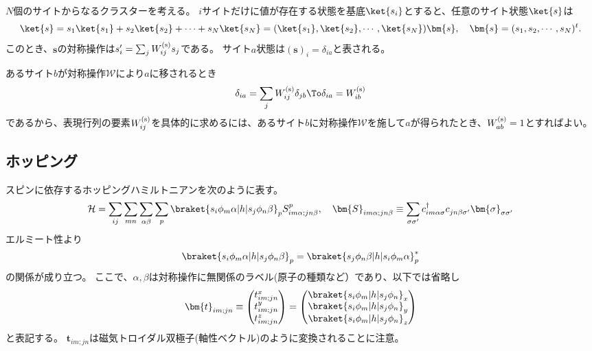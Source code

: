 \documentclass[11pt]{easymemo}
\begin{document}
$N$個のサイトからなるクラスターを考える。
$i$サイトだけに値が存在する状態を基底$\ket{s_{i}}$とすると、任意のサイト状態$\ket{s}$は
\begin{align}
  \ket{s}=s_{1}\ket{s_{1}}+s_{2}\ket{s_{2}}+\cdots +s_{N}\ket{s_{N}}
  =(\ket{s_{1}},\ket{s_{2}},\cdots,\ket{s_{N}})\bm{s},
  \quad
  \bm{s}=(s_{1},s_{2},\cdots,s_{N})^{t}.
\end{align}
このとき、$\bm{s}$の対称操作は$s_{i}'=\sum_{j}W_{ij}^{\rm (s)}s_{j}$である。
サイト$a$状態は$(\bm{s})_{i}=\delta_{ia}$と表される。

あるサイト$b$が対称操作$\mathcal{W}$により$a$に移されるとき
\begin{align}
  \delta_{ia}=\sum_{j}W_{ij}^{\rm (s)}\delta_{jb}
  \To
  \delta_{ia}=W_{ib}^{\rm (s)}
\end{align}
であるから、表現行列の要素$W_{ij}^{\rm (s)}$を具体的に求めるには、あるサイト$b$に対称操作$\mathcal{W}$を施して$a$が得られたとき、$W_{ab}^{\rm (s)}=1$とすればよい。


\subsection{ホッピング}
スピンに依存するホッピングハミルトニアンを次のように表す。
\begin{align}
\mathcal{H}=\sum_{ij}\sum_{mn}\sum_{\alpha\beta}\sum_{p}\braket{s_{i}\phi_{m}\alpha|h|s_{j}\phi_{n}\beta}_{p}S^{p}_{im\alpha;jn\beta},
\quad
\bm{S}_{im\alpha;jn\beta}\equiv \sum_{\sigma\sigma'}c_{im\alpha\sigma}^{\dagger}c_{jn\beta\sigma'}^{}\bm{\sigma}_{\sigma\sigma'}
\end{align}
エルミート性より
\begin{align}
\braket{s_{i}\phi_{m}\alpha|h|s_{j}\phi_{n}\beta}_{p}=\braket{s_{j}\phi_{n}\beta|h|s_{i}\phi_{m}\alpha}_{p}^{*}
\label{eq:77}
\end{align}
の関係が成り立つ。
ここで、$\alpha,\beta$は対称操作に無関係のラベル(原子の種類など）であり、以下では省略し
\begin{align}
\bm{t}_{im;jn}\equiv
\begin{pmatrix}
t_{im;jn}^{x} \\
t_{im;jn}^{y} \\
t_{im;jn}^{z}
\end{pmatrix}
=
\begin{pmatrix}
\braket{s_{i}\phi_{m}|h|s_{j}\phi_{n}}_{x} \\
\braket{s_{i}\phi_{m}|h|s_{j}\phi_{n}}_{y} \\
\braket{s_{i}\phi_{m}|h|s_{j}\phi_{n}}_{z}
\end{pmatrix}
\end{align}
と表記する。
$\bm{t}_{im;jn}$は磁気トロイダル双極子(軸性ベクトル)のように変換されることに注意。
\end{document}
